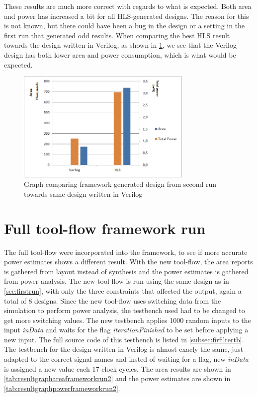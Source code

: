 These results are much more correct with regards to what is expected. Both area and power has increased a bit for all HLS-generated designs. The reason for this is not known, but there could have been a bug in the design or a setting in the first run that generated odd results. When comparing the best HLS result towards the design written in Verilog, as shown in \cref{fig:resultcomparisonhlsrun2}, we see that the Verilog design has both lower area and power consumption, which is what would be expected.

\begin{figure}[hbpt]
\centering
\includegraphics[width=0.75\textwidth]{../figs/resultComparison2.png}
\caption{\label{fig:resultcomparisonhlsrun2}Graph comparing framework generated design from second run towards same design written in Verilog}
\end{figure}

\section{Full tool-flow framework run}
The full tool-flow were incorporated into the framework, to see if more accurate power estimates shows a different result. With the new tool-flow, the area reports is gathered from layout instead of synthesis and the power estimates is gathered from power analysis. The new tool-flow is run using the same design as in \cref{sec:firstrun}, with only the three constraints that affected the output, again a total of 8 designs. Since the new tool-flow uses switching data from the simulation to perform power analysis, the testbench used had to be changed to get more switching values. The new testbench applies 1000 random inputs to the input \textit{inData} and waits for the flag \textit{iterationFinished} to be set before applying a new input. The full source code of this testbench is listed in \cref{subsec:firfiltertb}. The testbench for the design written in Verilog is almost exacly the same, just adapted to the correct signal names and insted of waiting for a flag, new \textit{inData} is assigned a new value each 17 clock cycles. The area results are shown in \cref{tab:resultgraphareaframeworkrun2} and the power estimates are shown in \cref{tab:resultgraphpowerframeworkrun2}.

